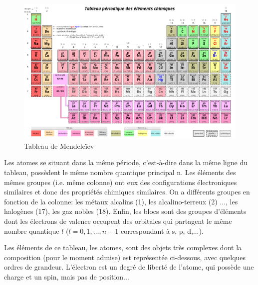 \begin{figure}[ht]
    \centering
    \includegraphics[scale=0.40]{Images1/mend.png}
    \caption{Tableau de Mendeleïev}
\end{figure}

Les atomes se situant dans la même période, c'est-à-dire dans la même ligne du tableau, possèdent le même nombre quantique principal n. Les éléments des mêmes groupes (i.e. même colonne) ont eux des configurations électroniques similaires et donc des propriétés chimiques similaires. On a différents groupes en fonction de la colonne: les métaux alcalins (1), les alcalino-terreux (2) ..., les halogènes (17), les gaz nobles (18). Enfin, les blocs sont des groupes d'éléments dont les électrons de valence occupent des orbitales qui partagent le même nombre quantique $l$ ($l=0,1, \dots, n-1$ correspondant à s, p, d,...).

Les éléments de ce tableau, les atomes, sont des objets très complexes dont la composition (pour le moment admise) est représentée ci-dessous, avec quelques ordres de grandeur. L'électron est un degré de liberté de l'atome, qui possède une charge et un spin, mais pas de position...

